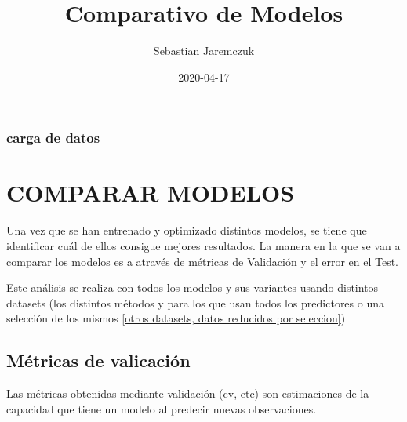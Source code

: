 \documentclass[]{article}
\title{Comparativo de Modelos}
\author{Sebastian Jaremczuk}
\date{2020-04-17}
\begin{document}
\maketitle

\hypertarget{carga-de-datos}{%
\subsubsection{carga de datos}\label{carga-de-datos}}

\hypertarget{comparar-modelos}{%
\section{COMPARAR MODELOS}\label{comparar-modelos}}

Una vez que se han entrenado y optimizado distintos modelos, se tiene
que identificar cuál de ellos consigue mejores resultados. La manera en
la que se van a comparar los modelos es a através de métricas de
Validación y el error en el Test.

Este análisis se realiza con todos los modelos y sus variantes usando
distintos datasets (los distintos métodos y para los que usan todos los
predictores o una selección de los mismos
\ref{otros datasets, datos reducidos por seleccion})

\hypertarget{muxe9tricas-de-valicaciuxf3n}{%
\subsection{Métricas de valicación}\label{muxe9tricas-de-valicaciuxf3n}}

Las métricas obtenidas mediante validación (cv, etc) son estimaciones de
la capacidad que tiene un modelo al predecir nuevas observaciones.
\end{document}
